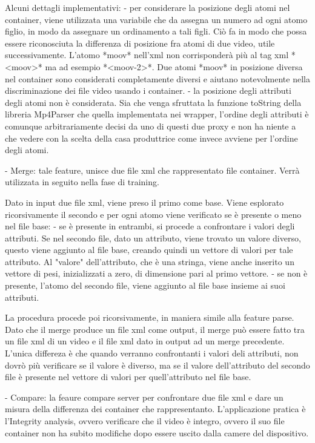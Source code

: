 Alcuni dettagli implementativi:
 - per considerare la posizione degli atomi nel container, viene utilizzata una variabile che da assegna un numero ad ogni atomo figlio, in modo da assegnare un ordinamento a tali figli. Ciò fa in modo che possa essere riconosciuta la differenza di posizione fra atomi di due video, utile successivamente. L'atomo *moov* nell'xml non corrisponderà più al tag xml *<moov>* ma ad esempio *<moov-2>*. Due atomi *moov* in posizione diversa nel container sono considerati completamente diversi e aiutano notevolmente nella discriminazione dei file video usando i container.
 - la posizione degli attributi degli atomi non è considerata. Sia che venga sfruttata la funzione toString della libreria Mp4Parser che quella implementata nei wrapper, l'ordine degli attributi è comunque arbitrariamente decisi da uno di questi due proxy e non ha niente a che vedere con la scelta della casa produttrice come invece avviene per l'ordine degli atomi.


- Merge:
 tale feature, unisce due file xml che rappresentato file container. Verrà utilizzata in seguito nella fase di training.

 Dato in input due file xml, viene preso il primo come base. Viene esplorato ricorsivamente il secondo e per ogni atomo viene verificato se è presente o meno nel file base:
 - se è presente in entrambi, si procede a confrontare i valori degli attributi. Se nel secondo file, dato un attributo, viene trovato un valore diverso, questo viene aggiunto al file base, creando quindi un vettore di valori per tale attributo. Al "valore" dell'attributo, che è una stringa, viene anche inserito un vettore di pesi, inizializzati a zero, di dimensione pari al primo vettore.
 - se non è presente, l'atomo del secondo file, viene aggiunto al file base insieme ai suoi attributi.

 La procedura procede poi ricorsivamente, in maniera simile alla feature parse.
 Dato che il merge produce un file xml come output, il merge può essere fatto tra un file xml di un video e il file xml dato in output ad un merge precedente. L'unica differeza è che quando verranno confrontanti i valori deli attributi, non dovrò più verificare se il valore è diverso, ma se il valore dell'attributo del secondo file è presente nel vettore di valori per quell'attributo nel file base.


- Compare:
 la feaure compare server per confrontare due file xml e dare un  misura della differenza dei container che rappresentanto. L'applicazione pratica è l'Integrity analysis, ovvero verificare che il video è integro, ovvero il suo file container non ha subito modifiche dopo essere uscito dalla camere del dispositivo.

